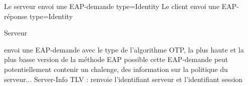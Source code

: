 \documentclass{article}
\begin{document}

Le serveur envoi une EAP-demande type=Identity
Le client envoi une EAP-réponse type=Identity

\begin{flushleft}
\begin{algorithm}
	\caption{Serveur}
	\label{TOTP:verif}
\begin{algorithmic}
\STATE envoi une EAP-demande avec le type de l'algorithme OTP, la plus haute et la plus basse version de la méthode EAP possible
\STATE cette EAP-demande peut potentiellement contenir un chalenge, des information sur la politique du serveur...
	\STATE Server-Info TLV : renvoie l'identifiant serveur et l'identifiant session
\ENDIF

\end{algorithmic}
\end{algorithm}
\end{flushleft}
\end{document}
